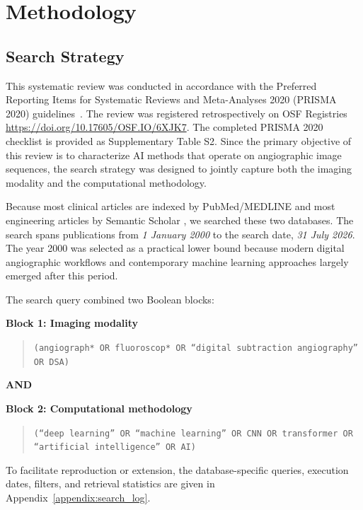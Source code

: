 \section{Methodology}
\subsection{Search Strategy}
\label{sec:search}
This systematic review was conducted in accordance with the Preferred Reporting Items for Systematic Reviews and Meta-Analyses 2020 (PRISMA 2020) guidelines~\cite{Page2021PRISMA}. The review was registered retrospectively on OSF Registries \href{https://doi.org/10.17605/OSF.IO/6XJK7} {https://doi.org/10.17605/OSF.IO/6XJK7}. The completed PRISMA 2020 checklist is provided as Supplementary Table S2. Since the primary objective of this review is to characterize AI methods that operate on angiographic image sequences, the search strategy was designed to jointly capture both the imaging modality and the computational methodology.


Because most clinical articles are indexed by PubMed/\allowbreak MEDLINE \cite{white2020pubmed} and most engineering articles by Semantic Scholar \cite{fricke2018semantic}, we searched these two databases. The search spans publications from \textit{1 January 2000} to the search date, \textit{31 July 2026}. The year 2000 was selected as a practical lower bound because modern digital angiographic workflows and contemporary machine learning approaches largely emerged after this period.

The search query combined two Boolean blocks:

\medskip
\noindent\begin{minipage}{\linewidth}
\noindent\textbf{Block 1: Imaging modality}
\begin{quote}
\small\texttt{(angiograph* OR fluoroscop* OR ``digital subtraction angiography'' OR DSA)}
\end{quote}

\noindent\textbf{AND}

\noindent\textbf{Block 2: Computational methodology}
\begin{quote}
\small\texttt{(``deep learning'' OR ``machine learning'' OR CNN OR transformer OR ``artificial intelligence'' OR AI)}
\end{quote}
\end{minipage}
\medskip


To facilitate reproduction or extension, the database-specific queries, execution dates, filters, and retrieval statistics are given in Appendix~\ref{appendix:search_log}.


